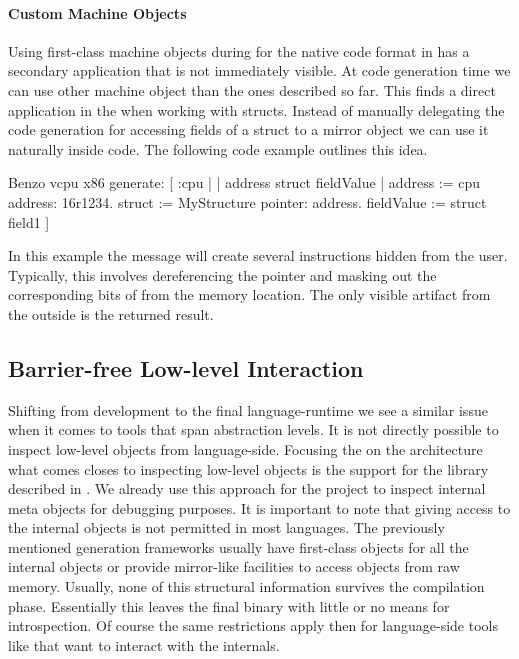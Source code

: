 \paragraph{Custom Machine Objects}
Using first-class machine objects during for the native code format in \VCPU has a secondary application that is not immediately visible.
At code generation time we can use other machine object than the ones described so far.
This finds a direct application in the \NB \FFI when working with structs.
Instead of manually delegating the code generation for accessing fields of a struct to a mirror object we can use it naturally inside \VCPU code.
The following code example outlines this idea.
\begin{stcode}{}
Benzo vcpu x86 generate: [ :cpu |
	| address struct fieldValue |
	address    := cpu address: 16r1234.
	struct     := MyStructure pointer: address.
	fieldValue := struct field1 ]
\end{stcode}
In this example the  message will create several instructions hidden from the user.
Typically, this involves dereferencing the pointer and masking out the corresponding bits of  from the memory location. 
The only visible artifact from the outside is the returned result.



\subsection{Barrier-free Low-level Interaction}
Shifting from \VM development to the final language-runtime we see a similar issue when it comes to tools that span abstraction levels.
It is not directly possible to inspect low-level objects from language-side.
Focusing the on the \B architecture what comes closes to inspecting low-level objects is the  support for the \NB \FFI library described in .
We already use this approach for the \NBJ project to inspect \VM internal meta objects for debugging purposes.
It is important to note that giving access to the \VM internal objects is not permitted in most languages.
The previously mentioned \VM generation frameworks usually have first-class objects for all the \VM internal objects or provide mirror-like facilities to access objects from raw memory.
Usually, none of this structural information survives the \VM compilation phase.
Essentially this leaves the final \VM binary with little or no means for introspection. Of course the same restrictions apply then for language-side tools like \B that want to interact with the \VM internals.

